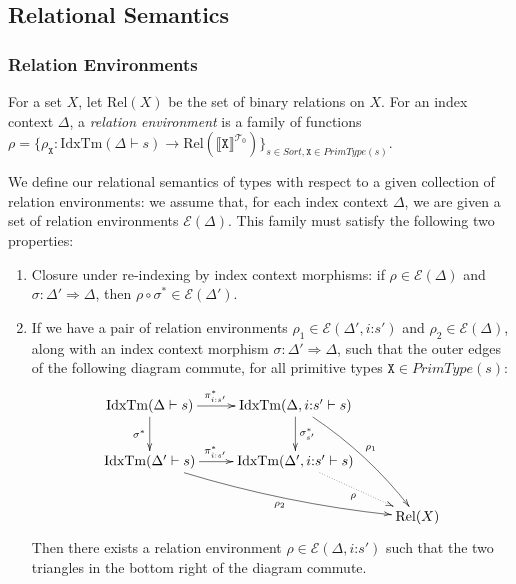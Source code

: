 \documentclass[natbib,preprint]{sigplanconf}
\newcommand{\Rel}{\mathrm{Rel}}
\newcommand{\idxTms}[2]{\mathrm{IdxTm}(#1 \vdash #2)}
\newcommand{\tyPrimNm}[1]{\texttt{#1}}
\newcommand{\relEnv}[1]{\mathcal{#1}}
\newcommand{\tyPrimSem}[1]{\llbracket \tyPrimNm{#1} \rrbracket^{\mathcal{T}_0}}
\begin{document}
\subsection{Relational Semantics}

\subsubsection{Relation Environments}

For a set $X$, let $\Rel(X)$ be the set of binary relations on
$X$. For an index context $\Delta$, a \emph{relation environment} is a
family of functions $\rho = \{ \rho_{\tyPrimNm{X}} :
\idxTms{\Delta}{s} \to \Rel(\tyPrimSem{X}) \}_{s \in \mathit{Sort},
  \tyPrimNm{X} \in \mathit{PrimType}(s)}$.

We define our relational semantics of types with respect to a given
collection of relation environments: we assume that, for each index
context $\Delta$, we are given a set of relation environments
$\relEnv{E}(\Delta)$. This family must satisfy the following two
properties:
\begin{enumerate}
\item Closure under re-indexing by index context morphisms: if $\rho
  \in \relEnv{E}(\Delta)$ and $\sigma : \Delta' \Rightarrow \Delta$,
  then $\rho \circ \sigma^* \in \relEnv{E}(\Delta')$.
\item If we have a pair of relation environments $\rho_1 \in
  \relEnv{E}(\Delta', i\mathord:s')$ and $\rho_2 \in
  \relEnv{E}(\Delta)$, along with an index context morphism $\sigma :
  \Delta' \Rightarrow \Delta$, such that the outer edges of the
  following diagram commute, for all primitive types $\tyPrimNm{X} \in
  \mathit{PrimType}(s)$:
  \begin{displaymath}
    \xymatrix{
      {\idxTms{\Delta}{s}} \ar[r]^(.45){\pi^*_{i\mathord:s'}} \ar[d]_{\sigma^*}
      &
      {\idxTms{\Delta,i\mathord:s'}{s}} \ar[d]^{\sigma_{s'}^*} \ar@/^/[rdd]^{\rho_1}
      \\
      {\idxTms{\Delta'}{s}} \ar[r]^(.45){\pi^*_{i\mathord:s'}} \ar@/_/[rrd]_{\rho_2}
      &
      {\idxTms{\Delta',i\mathord:s'}{s}} \ar@{.>}[dr]_\rho
      \\
      &
      &
      {\Rel(X)}
    }
  \end{displaymath}
  Then there exists a relation environment $\rho \in
  \relEnv{E}(\Delta,i\mathord:s')$ such that the two triangles in the
  bottom right of the diagram commute.
\end{enumerate}
\end{document}
